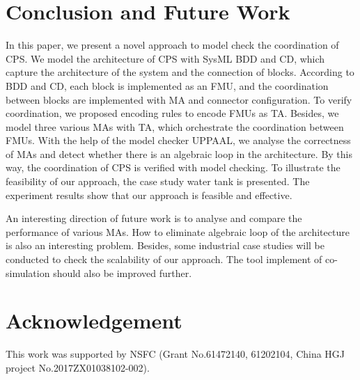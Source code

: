\section{Conclusion and Future Work}
\label{sec:conclusion&ack}
In this paper, we present a novel approach to model check the coordination of CPS.  We model the architecture of CPS with SysML BDD and CD, which capture the architecture of the system and the connection of blocks. According to BDD and CD, each block is implemented as an FMU, and the coordination between blocks are implemented with MA and connector configuration. To verify coordination, we proposed encoding rules to encode FMUs as TA. Besides, we model three various MAs with TA, which orchestrate the coordination between FMUs. With the help of the model checker UPPAAL, we  analyse the correctness of MAs and detect whether there is an algebraic loop in the architecture. By this way, the coordination of CPS is verified with model checking. To illustrate the feasibility of our approach, the case study water tank is presented. The experiment results show that our approach is feasible and effective. 

An interesting direction of future work is to analyse and compare the performance of various MAs. How to eliminate algebraic loop of the architecture is also an interesting problem. Besides, some industrial case studies will be conducted to check the scalability of our approach. The tool implement of co-simulation should also be improved further.
\section*{Acknowledgement}
This work was supported by NSFC (Grant No.61472140, 61202104, China HGJ project No.2017ZX01038102-002). 



